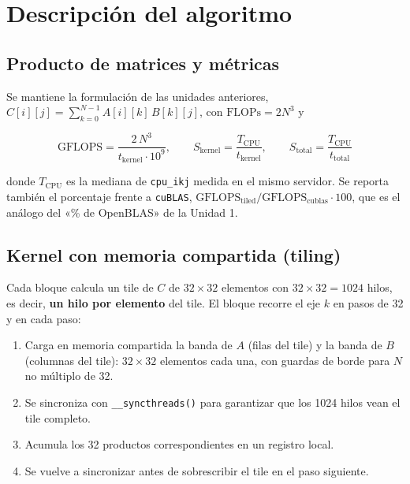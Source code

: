 \section{Descripción del algoritmo}

\subsection{Producto de matrices y métricas}

	Se mantiene la formulación de las unidades anteriores, $C[i][j] = \sum_{k=0}^{N-1} A[i][k]\,B[k][j]$, con $\text{FLOPs} = 2N^3$ y

	\begin{equation}
		\text{GFLOPS} = \frac{2\,N^3}{t_{\text{kernel}} \cdot 10^9}, \qquad
		S_{\text{kernel}} = \frac{T_{\text{CPU}}}{t_{\text{kernel}}}, \qquad
		S_{\text{total}} = \frac{T_{\text{CPU}}}{t_{\text{total}}}
		\label{eqn:metricas}
	\end{equation}

	donde $T_{\text{CPU}}$ es la mediana de \texttt{cpu\_ikj} medida en el mismo servidor. Se reporta también el porcentaje frente a \texttt{cuBLAS}, $\text{GFLOPS}_{\text{tiled}} / \text{GFLOPS}_{\text{cublas}} \cdot 100$, que es el análogo del «\% de OpenBLAS» de la Unidad 1.

\subsection{Kernel con memoria compartida (tiling)}

	Cada bloque calcula un tile de $C$ de $32 \times 32$ elementos con $32 \times 32 = 1024$ hilos, es decir, \textbf{un hilo por elemento} del tile. El bloque recorre el eje $k$ en pasos de 32 y en cada paso:

	\begin{enumerate}
		\item Carga en memoria compartida la banda de $A$ (filas del tile) y la banda de $B$ (columnas del tile): $32 \times 32$ elementos cada una, con guardas de borde para $N$ no múltiplo de 32.
		\item Se sincroniza con \texttt{\_\_syncthreads()} para garantizar que los 1024 hilos vean el tile completo.
		\item Acumula los 32 productos correspondientes en un registro local.
		\item Se vuelve a sincronizar antes de sobrescribir el tile en el paso siguiente.
	\end{enumerate}

